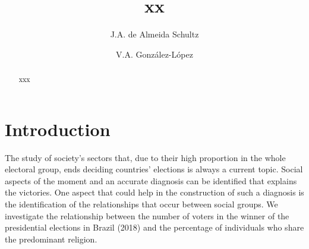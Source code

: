 \documentclass{aip-cp}
\begin{document}
 
\title{xx}

\author[aff1]{J.A. de Almeida Schultz}

\author[aff1]{V.A. Gonz\'{a}lez-L\'{o}pez}


\maketitle

\begin{abstract}
xxx
\end{abstract}

\section{Introduction} \label{prelim}
The study of society's sectors that, due to their high proportion in the whole electoral group, ends deciding countries' elections is always a current topic. Social aspects of the moment and an accurate diagnosis can be identified that explains the victories. 
One aspect that could help in the construction of such a diagnosis is the identification of the relationships that occur between social groups. We investigate the relationship between the number of voters in the winner of the presidential elections in Brazil (2018) and the percentage of individuals who share the predominant religion. 
\setcounter{section}{1}
\end{document}
